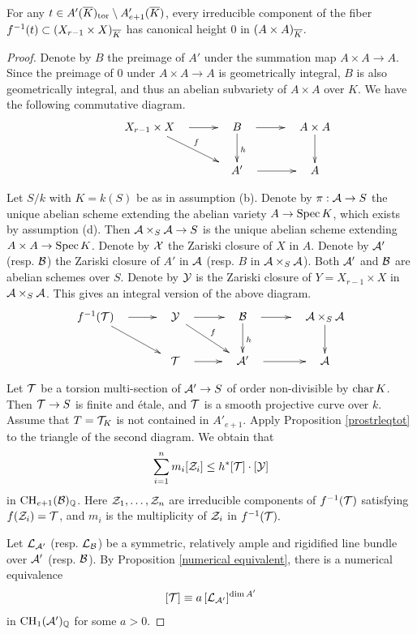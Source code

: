\documentclass[12pt]{amsart}
\begin{document}
\begin{pro} \label{torsion fiber}
For any $t\in A'({\overline{K}})_{\mathrm{tor}}\setminus A'_{e+1}({\overline{K}})$, every irreducible component of the fiber $f^{-1}(t)\subset (X_{r-1}\times X)_{\overline{K}}$ has canonical height 0 in $(A\times A)_{\overline{K}}$.  
\end{pro}
\begin{proof}
Denote by $B$ the preimage of $A'$ under the summation map $A\times A\to A$. 
Since the preimage of $0$ under $A\times A\to A$ is geometrically integral, $B$ is also geometrically integral, and thus an abelian subvariety of $A\times A$ over $K$. We have the following commutative diagram.
$$
\xymatrix{
&\quad X_{r-1}\times X \quad  \ar[r] \ar[rd]^f  & \quad B \quad  \ar[d]^h \ar[r] &
\quad A\times A \quad \ar[d]
\\
&
&
\quad A' \quad \ar[r]
&
\quad A \quad
}
$$

Let $S/k$ with $K=k(S)$ be as in assumption (b). 
Denote by $\pi:{\mathcal A}\to S$ the unique abelian scheme extending the abelian variety $A\to {\rm Spec \,} K$, which exists by assumption (d). 
Then ${\mathcal A}\times_S{\mathcal A} \to S$ is the unique abelian scheme extending $A\times A\to {\rm Spec \,} K$.
Denote by ${\mathcal X}$ the Zariski closure of $X$ in $A$. 
Denote by ${\mathcal A}'$ (resp. ${\mathcal B}$) the Zariski closure of $A'$ in ${\mathcal A}$ (resp. $B$ in ${\mathcal A}\times_S{\mathcal A}$). Both ${\mathcal A}'$ and ${\mathcal B}$ are abelian schemes over $S$. 
Denote by ${\mathcal Y}$ is the Zariski closure of $Y=X_{r-1}\times X$ in ${\mathcal A}\times_S {\mathcal A}$. 
This gives an integral version of the above diagram.
$$
\xymatrix{
\quad f^{-1}(\sT) \quad \ar[r] \ar[rd]
&\quad \sY \quad  \ar[r] \ar[rd]^f  & \quad \sB \quad  \ar[d]^h \ar[r] &
\quad \sA\times_S\sA \quad \ar[d]
\\
&
\quad \sT \quad \ar[r]
&
\quad \sA' \quad \ar[r]
&
\quad \sA \quad
}
$$

Let ${\mathcal T}$ be a torsion multi-section of ${\mathcal A}'\to S$ of order non-divisible by ${\rm char\,} K$.
Then ${\mathcal T}\to S$ is finite and \'etale, and ${\mathcal T}$ is a smooth projective curve over $k$.
Assume that $T={\mathcal T}_K$ is not contained in $A'_{e+1}.$
Apply Proposition \ref{prostrleqtot} to the triangle of the second diagram. 
We obtain that 
$$\sum_{i=1}^n m_i[{\mathcal Z}_i]\leq h^*[{\mathcal T}]\cdot [{\mathcal Y}]$$
in ${\rm CH}_{e+1}({\mathcal B})_{\mathbb Q}$. 
Here ${\mathcal Z}_1, \dots, {\mathcal Z}_n$ are irreducible components of $f^{-1}({\mathcal T})$ satisfying 
$f({\mathcal Z}_i)={\mathcal T}$, and $m_i$ is the multiplicity of ${\mathcal Z}_i$ in $f^{-1}({\mathcal T}).$ 

Let ${\mathcal L}_{{\mathcal A}'}$ (resp. ${\mathcal L}_{\mathcal B}$) be a symmetric, relatively ample and rigidified line bundle over ${\mathcal A}'$ (resp. ${\mathcal B}$).
By Proposition \ref{numerical equivalent}, there is a numerical equivalence 
$$[{\mathcal T}]\equiv
a\, [{\mathcal L}_{{\mathcal A}'}]^{\dim A'}$$ 
in ${\rm CH}_{1}({\mathcal A}')_{\mathbb Q}$ for some $a>0$.


\end{proof}
\end{document}
